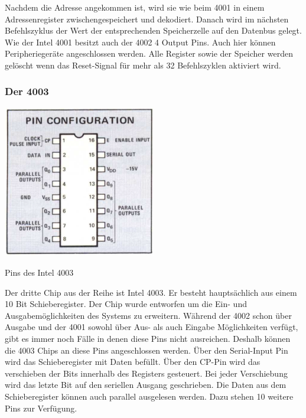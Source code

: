  Nachdem die Adresse angekommen ist, wird sie wie beim 4001 in einem Adressenregister zwischengespeichert und dekodiert. Danach wird im nächsten Befehlszyklus der Wert der entsprechenden Speicherzelle auf den Datenbus gelegt. Wie der Intel 4001 besitzt auch der 4002 4 Output Pins. Auch hier können Peripheriegeräte angeschlossen werden. Alle Register sowie der Speicher werden gelöscht wenn das Reset-Signal für mehr als 32 Befehlszyklen aktiviert wird.

\subsubsection{Der 4003}
 \begin{floatingfigure}[r]{.5\textwidth}
 	\vspace{-10pt}
 	\includegraphics[width=0.5\textwidth]{figures/pins_4003.png}
 	\caption{Pins des Intel 4003}
 	\label{fig:pins_4003}
 \end{floatingfigure}
Der dritte Chip aus der Reihe ist Intel 4003. Er besteht hauptsächlich aus einem 10 Bit Schieberegister. Der Chip wurde entworfen um die Ein- und Ausgabemöglichkeiten des Systems zu erweitern. Während der 4002 schon über Ausgabe und der 4001 sowohl über Aus- als auch Eingabe Möglichkeiten verfügt, gibt es immer noch Fälle in denen diese Pins nicht ausreichen. Deshalb können die 4003 Chips an diese Pins angeschlossen werden. Über den Serial-Input Pin wird das Schieberegister mit Daten befüllt. Über den CP-Pin wird das verschieben der Bits innerhalb des Registers gesteuert. Bei jeder Verschiebung wird das letzte Bit auf den seriellen Ausgang geschrieben. Die Daten aus dem Schieberegister können auch parallel ausgelesen werden. Dazu stehen 10 weitere Pins zur Verfügung.
